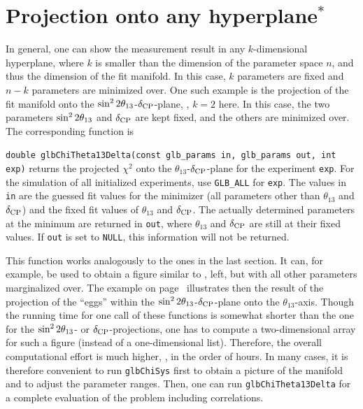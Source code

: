 \section[Projection onto any hyperplane$^*$]{Projection onto any hyperplane$^*$}

In general, one can show the measurement result in any $k$-dimensional hyperplane, where $k$ is smaller than the dimension of the parameter space $n$, and thus the dimension of the fit manifold. In this case, $k$ parameters are fixed and $n-k$ parameters are minimized over. One such example is the projection of the fit manifold onto the $\sin^2 2 \theta_{13}$-$\delta_{\mathrm{CP}}$-plane, \ie, $k=2$ here. In this case, the two
parameters $\sin^2 2 \theta_{13}$ and $\delta_{\mathrm{CP}}$ are kept fixed, and the others are
minimized over. 
The corresponding function is 
\begin{function}
{\tt double glbChiTheta13Delta(const glb\_params in, glb\_params out, int exp)} returns the projected $\chi^2$ onto the $\theta_{13}$-$\delta_{\mathrm{CP}}$-plane for the  experiment {\tt exp}. For the simulation of all initialized experiments,
use {\tt GLB\_ALL} for {\tt exp}. The values in {\tt in} are the guessed fit values for the minimizer (all parameters other than $\theta_{13}$ and $\delta_{\mathrm{CP}}$) and the fixed fit values of $\theta_{13}$ and $\delta_{\mathrm{CP}}$. The actually determined parameters at the minimum are returned in {\tt out}, where $\theta_{13}$ and $\delta_{\mathrm{CP}}$ are still at their fixed values. If {\tt out} is set to {\tt NULL}, this information will not be returned.
\end{function}
This function works analogously to the ones in the last section. It can, for example, be used to obtain a figure similar to , left, but with all other parameters marginalized over.
The example on page~\pageref{ex:corrproj} illustrates then the result of the
projection of the ``eggs'' within the 
$\sin^2 2 \theta_{13}$-$\delta_{\mathrm{CP}}$-plane onto the $\theta_{13}$-axis. 
Though the running time for one call of these functions is somewhat 
shorter than the one for the $\sin^2 2 \theta_{13}$- or $\delta_{\mathrm{CP}}$-projections, one 
has to compute a two-dimensional array for such a figure (instead of a 
one-dimensional list). Therefore, the overall computational effort is 
much higher, \ie, in the order of hours. In many cases, it is therefore
convenient to run {\tt glbChiSys} first to obtain a picture of
the manifold and to adjust the parameter ranges. Then, one can run
{\tt glbChiTheta13Delta} for a complete evaluation of the problem
including correlations.

